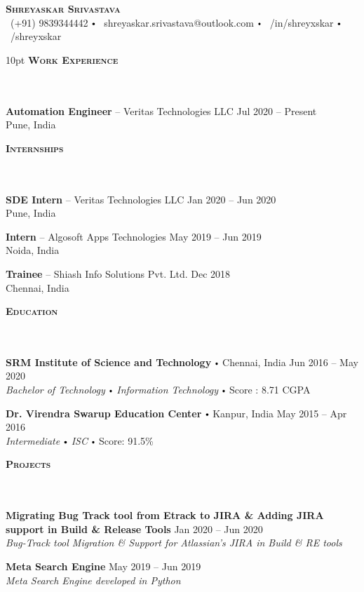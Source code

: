 \documentclass{article}
\newcommand{\contact}[3]{
\vspace*{5pt}
\begin{center}
{\LARGE \scshape {#1}}\\
\vspace{3pt}
#2 
\vspace{2pt}
#3
\end{center}
\vspace*{-8pt}
}
\newcommand{\header}[1]{{
\hspace*{-15pt}\vspace*{6pt} \textsc{#1}} \vspace*{-6pt} 
\lineunder
}
\newcommand{\lineunder}{
\vspace*{-8pt} \\ \hspace*{-18pt} 
\hrulefill \\
}
\newcommand{\school}[4]{
\textbf{#1} \labelitemi #2 \hfill #3 \\ #4 \vspace*{5pt}
}
\newcommand{\employer}[4]{{
\vspace*{2pt}%
\textbf{#1} #2 \hfill #3\\ #4 \vspace*{2pt}}
}
\newcommand{\project}[4]{{
\vspace*{2pt}%
\textbf{#1} #2 \hfill #3\\ \textit{#4} \vspace*{2pt}}
}
\renewcommand{\labelitemi}{
$\vcenter{\hbox{\tiny$\bullet$}}$\hspace*{3pt}
}
\renewcommand{\labelitemii}{
$\vcenter{\hbox{\tiny$\bullet$}}$\hspace*{-3pt}
}
\newenvironment{bullet-list-minor}{
\begin{list}{\labelitemii}{\setlength\leftmargin{15pt} 
\topsep 0pt \itemsep -2pt}}{\vspace*{4pt}\end{list}
}
\begin{document}
\small
\smallskip
\vspace*{-30pt}
\contact{\textbf{Shreyaskar Srivastava}}
{\faPhone\ (+91) 9839344442  \labelitemi \faEnvelope\ shreyaskar.srivastava@outlook.com  \labelitemi \faLinkedin\ /in/shreyxskar  \labelitemi \faGithub\ /shreyxskar}

\vspace{10pt}
\header{\textbf{Work Experience}}
    \employer{Automation Engineer}{-- Veritas Technologies LLC}{Jul 2020 -- Present}{Pune, India}

\vspace*{6pt}%
\header{\textbf{Internships}}
    \employer{SDE Intern}{-- Veritas Technologies LLC}{Jan 2020 -- Jun 2020}{Pune, India}

    \employer{Intern}{-- Algosoft Apps Technologies}{May 2019 -- Jun 2019}{Noida, India}

    \employer{Trainee}{-- Shiash Info Solutions Pvt. Ltd.}{Dec 2018 }{Chennai, India}

\vspace*{6pt}%
\header{\textbf{Education}}
    \school{SRM Institute of Science and Technology}{Chennai, India}{Jun 2016 -- May 2020}
    {\textit{Bachelor of Technology \labelitemi Information Technology}\labelitemi Score : 8.71 CGPA}

    \school{Dr. Virendra Swarup Education Center}{Kanpur, India}{May 2015 -- Apr 2016}
    {\textit{Intermediate \labelitemi ISC}\labelitemi Score: 91.5\%}

\vspace*{6pt}%
\header{\textbf{Projects}}
    \project{Migrating Bug Track tool from Etrack to JIRA {\&} Adding\newline
    JIRA support in Build {\&} Release Tools}{ }{ Jan 2020 -- Jun 2020}{Bug-Track tool Migration {\&} Support for Atlassian's JIRA in Build {\&} RE tools}
    
    \project{Meta Search Engine}{ }{ May 2019 -- Jun 2019}{Meta Search Engine developed in Python}
\end{document}
